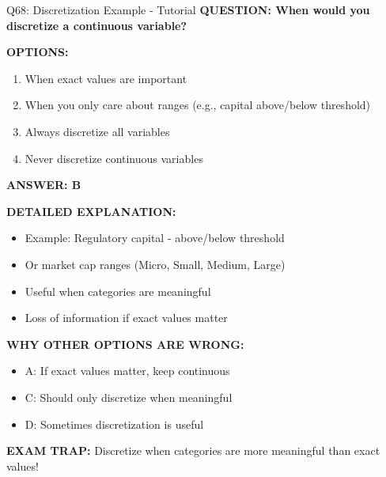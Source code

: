 \documentclass[8pt]{beamer}
\begin{document}
	\begin{frame}{Q68: Discretization Example - Tutorial}
		\fontsize{6.5}{7.5}\selectfont
		\textbf{QUESTION: When would you discretize a continuous variable?}
		
		\vspace{0.1cm}
		\textbf{OPTIONS:}
		\begin{enumerate}
			\item When exact values are important
			\item When you only care about ranges (e.g., capital above/below threshold)
			\item Always discretize all variables
			\item Never discretize continuous variables
		\end{enumerate}
		
		\vspace{0.1cm}
		\textcolor{myblue}{\textbf{ANSWER: B}}
		
		\vspace{0.1cm}
		\textbf{DETAILED EXPLANATION:}
		\begin{itemize}
			\item Example: Regulatory capital - above/below threshold
			\item Or market cap ranges (Micro, Small, Medium, Large)
			\item Useful when categories are meaningful
			\item Loss of information if exact values matter
		\end{itemize}
		
		\vspace{0.1cm}
		\textcolor{myred}{\textbf{WHY OTHER OPTIONS ARE WRONG:}}
		\begin{itemize}
			\item \textcolor{myred}{A:} If exact values matter, keep continuous
			\item \textcolor{myred}{C:} Should only discretize when meaningful
			\item \textcolor{myred}{D:} Sometimes discretization is useful
		\end{itemize}
		
		\textcolor{myred}{\textbf{EXAM TRAP:}} Discretize when \textcolor{myblue}{categories are more meaningful than exact values}!
	\end{frame}
	
\end{document}

